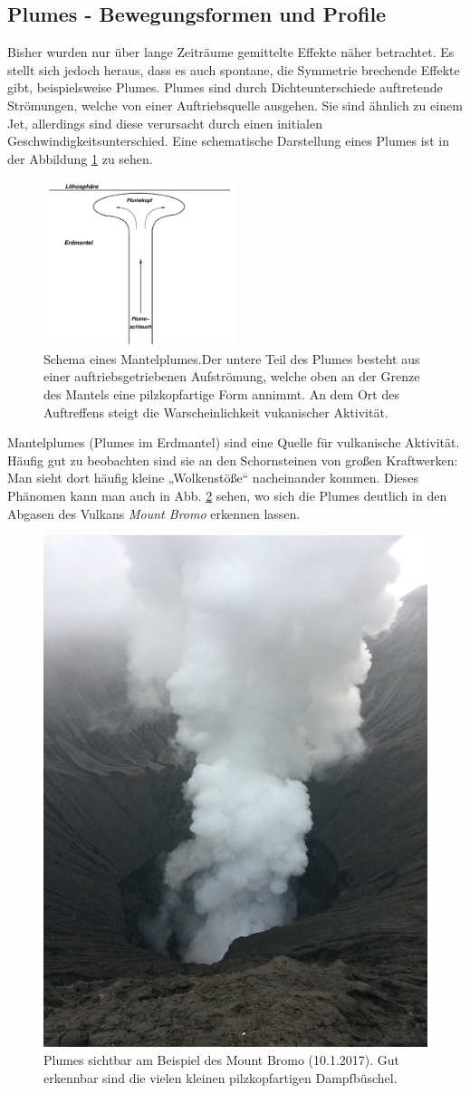 \documentclass[12pt,a4paper,titlepage,headinclude]{scrartcl}
\numberwithin{equation}{subsection}
\begin{document}
\subsection{Plumes - Bewegungsformen und Profile}
Bisher wurden nur über lange Zeiträume gemittelte Effekte näher betrachtet.
Es stellt sich jedoch heraus, dass es auch spontane, die Symmetrie brechende Effekte gibt, beispielsweise Plumes.
Plumes sind durch Dichteunterschiede auftretende Strömungen, welche von einer Auftriebsquelle ausgehen.
Sie sind ähnlich zu einem Jet, allerdings sind diese verursacht durch einen initialen Geschwindigkeitsunterschied.
Eine schematische Darstellung eines Plumes ist in der Abbildung \ref{fig:plume} zu sehen.
\begin{figure}[!ht]
\centering
\includegraphics[width=0.5\textwidth]{Plume.png}
\caption{Schema eines Mantelplumes.\protect\footnotemark Der untere Teil des Plumes besteht aus einer auftriebsgetriebenen Aufströmung, welche oben an der Grenze des Mantels eine pilzkopfartige Form annimmt. An dem Ort des Auftreffens steigt die Warscheinlichkeit vukanischer Aktivität.}
\label{fig:plume}
\end{figure}
Mantelplumes (Plumes im Erdmantel) sind eine Quelle für vulkanische Aktivität.
Häufig gut zu beobachten sind sie an den Schornsteinen von großen Kraftwerken: Man sieht dort häufig kleine „Wolkenstöße“ nacheinander kommen.
Dieses Phänomen kann man auch in Abb. \ref{fig:bromo_plumes} sehen, wo sich die Plumes deutlich in den Abgasen des Vulkans \textit{Mount Bromo} erkennen lassen.
\begin{figure}[!h]
  \centering
  \includegraphics[width=0.4\linewidth]{bromo_plumes}
  \caption{Plumes sichtbar am Beispiel des Mount Bromo (10.1.2017). Gut erkennbar sind die vielen kleinen pilzkopfartigen Dampfbüschel.}
  \label{fig:bromo_plumes}
\end{figure}
\end{document}
